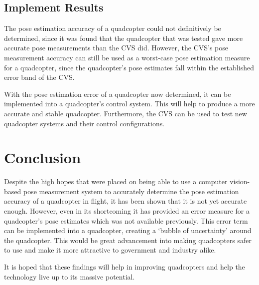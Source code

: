 \subsection{Implement Results}

The pose estimation accuracy of a quadcopter could not definitively be determined, since it was found that the quadcopter that was tested gave more accurate pose measurements than the CVS did. However, the CVS's pose measurement accuracy can still be used as a worst-case pose estimation measure for a quadcopter, since the quadcopter's pose estimates fall within the established error band of the CVS.\@ 

With the pose estimation error of a quadcopter now determined, it can be implemented into a quadcopter's control system. This will help to produce a more accurate and stable quadcopter. Furthermore, the CVS can be used to test new quadcopter systems and their control configurations. 

\section{Conclusion}

Despite the high hopes that were placed on being able to use a computer vision-based pose measurement system to accurately determine the pose estimation accuracy of a quadcopter in flight, it has been shown that it is not yet accurate enough. However, even in its shortcoming it has provided an error measure for a quadcopter's pose estimates which was not available previously. This error term can be implemented into a quadcopter, creating a `bubble of uncertainty' around the quadcopter. This would be great advancement into making quadcopters safer to use and make it more attractive to government and industry alike. 

It is hoped that these findings will help in improving quadcopters and help the technology live up to its massive potential. 
